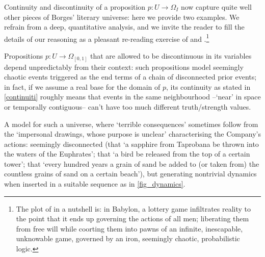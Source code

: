 Continuity and discontinuity of a proposition $p : U \to \Omega_I$ now capture quite well other pieces of Borges' literary universe: here we provide two examples. We refrain from a deep, quantitative analysis, and we invite the reader to fill the details of our reasoning as a pleasant re-reading exercise of \cite{babil} and \cite{tlonEN}.\footnote{The plot of \cite{babil} in a nutshell is: in Babylon, a lottery game infiltrates reality to the point that it ends up governing the actions of all men; liberating them from free will while coorting them into pawns of an infinite, inescapable, unknowable game, governed by an iron, seemingly chaotic, probabilistic logic.}
\begin{example}\label{bli}
  Propositions $p : U \to \Omega_{[0,1]}$ that are allowed to be discontinuous in its variables depend unpredictably from their context: such propositions model seemingly chaotic events triggered as the end terms of a chain of disconnected prior events; in fact, if we assume a real base for the domain of $p$, its continuity as stated in \autoref{continuiti} roughly means that events in the same neighbourhood --`near' in space or temporally contiguous-- can't have too much different truth/strength values.

  A model for such a universe, where `terrible consequences' sometimes follow from the `impersonal drawings, whose purpose is unclear' characterising the Company's actions: seemingly disconnected (that `a sapphire from Taprobana be thrown into the waters of the Euphrates'; that `a bird be released from the top of a certain tower'; that `every hundred years a grain of sand be added to (or taken from) the countless grains of sand on a certain beach'), but generating nontrivial dynamics when inserted in a suitable sequence as in \autoref{fig_dynamics}.


\end{example}
